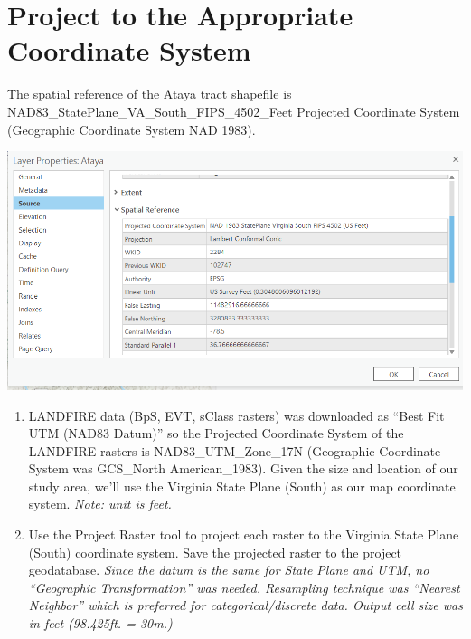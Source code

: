 \documentclass[
]{book}
\begin{document}
\hypertarget{project-to-the-appropriate-coordinate-system}{%
\section{Project to the Appropriate Coordinate System}\label{project-to-the-appropriate-coordinate-system}}

The spatial reference of the Ataya tract shapefile is NAD83\_StatePlane\_VA\_South\_FIPS\_4502\_Feet Projected Coordinate System (Geographic Coordinate System NAD 1983).

\includegraphics[width=1000px]{04_gis_screenshots/4_crs_ataya}

\begin{enumerate}
\def\labelenumi{\arabic{enumi}.}
\item
  LANDFIRE data (BpS, EVT, sClass rasters) was downloaded as ``Best Fit UTM (NAD83 Datum)'' so the Projected Coordinate System of the LANDFIRE rasters is NAD83\_UTM\_Zone\_17N (Geographic Coordinate System was GCS\_North American\_1983).
  Given the size and location of our study area, we'll use the Virginia State Plane (South) as our map coordinate system. \emph{Note: unit is feet.}
\item
  Use the Project Raster tool to project each raster to the Virginia State Plane (South) coordinate system. Save the projected raster to the project geodatabase. \emph{Since the datum is the same for State Plane and UTM, no ``Geographic Transformation'' was needed. Resampling technique was ``Nearest Neighbor'' which is preferred for categorical/discrete data. Output cell size was in feet (98.425ft. = 30m.)}
\end{enumerate}
\end{document}
